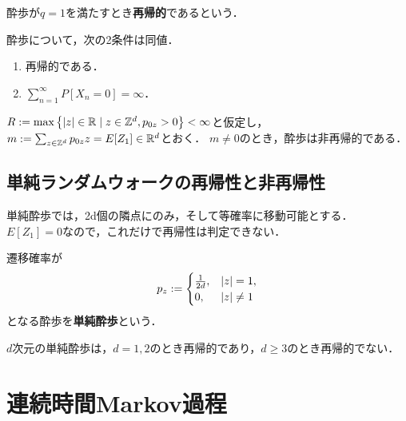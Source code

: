 \documentclass[uplatex,dvipdfmx]{jsreport}
\begin{document}
\begin{definition}[recurrent]
    酔歩が$q=1$を満たすとき\textbf{再帰的}であるという．
\end{definition}

\begin{lemma}
    酔歩について，次の2条件は同値．
    \begin{enumerate}
        \item 再帰的である．
        \item $\sum^\infty_{n=1}P[X_n=0]=\infty$．
    \end{enumerate}
\end{lemma}

\begin{theorem}[非再帰性の十分条件]
    $R:=\max\left\{\lvert z\rvert\in\mathbb{R}\mid z\in\mathbb{Z}^d,p_{0z}>0\right\}<\infty$と仮定し，
    $m:=\sum_{z\in\mathbb{Z}^d}p_{0z}z=E[Z_1]\in\mathbb{R}^d$とおく．
    $m\ne0$のとき，酔歩は非再帰的である．
\end{theorem}

\subsection{単純ランダムウォークの再帰性と非再帰性}

\begin{tcolorbox}[colframe=ForestGreen, colback=ForestGreen!10!white,breakable,colbacktitle=ForestGreen!40!white,coltitle=black,fonttitle=\bfseries\sffamily,
title=]
    単純酔歩では，2d個の隣点にのみ，そして等確率に移動可能とする．
    $E[Z_1]=0$なので，これだけで再帰性は判定できない．
\end{tcolorbox}

\begin{definition}
    遷移確率が
    \[p_z:=\begin{cases}
        \frac{1}{2d},&\lvert z\rvert=1,\\
        0,&\lvert z\rvert\ne1
    \end{cases}\]
    となる酔歩を\textbf{単純酔歩}という．
\end{definition}

\begin{theorem}[Polya]
    $d$次元の単純酔歩は，$d=1,2$のとき再帰的であり，$d\ge3$のとき再帰的でない．
\end{theorem}



\section{連続時間Markov過程}
\end{document}
